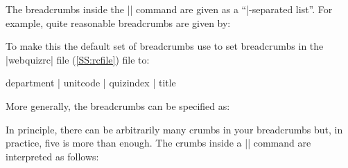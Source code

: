 \documentclass[svgnames]{article}
\newcommand\webquizrc{\index{webquizrc}%
  \BashCode|webquizrc| file (\autoref{SS:rcfile})\xspace%
}
\begin{document}
    The breadcrumbs inside the \LatexCode|| command are given as
    a ``|-separated list''. For example, quite reasonable breadcrumbs are given by:
    \begin{latexcode}
    \end{latexcode}
    To make this the default set of breadcrumbs use
     to set breadcrumbs
    in the \webquizrc file to:
    \begin{latexcode}
       department | unitcode | quizindex | title
    \end{latexcode}
    More generally, the breadcrumbs can be specified as:
    \begin{latexcode}
    \end{latexcode}
    In principle, there can be arbitrarily many crumbs in your
    breadcrumbs but, in practice, five is more than enough.
    The crumbs inside a \LatexCode|\BreadCrumbs| command are interpreted as follows:
\end{document}
